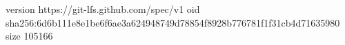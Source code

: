 version https://git-lfs.github.com/spec/v1
oid sha256:6d6b111e8e1be6f6ae3a624948749d78854f8928b776781f1f31cb4d71635980
size 105166
